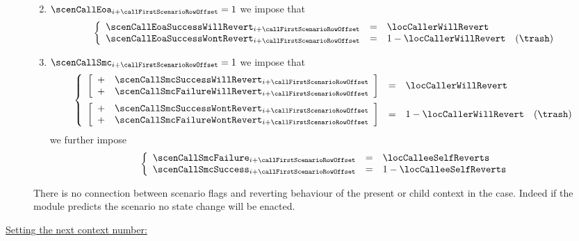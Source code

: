 \begin{description}
\begin{enumerate}
\[				\]
			\item \If $\scenCallEoa  _{i + \callFirstScenarioRowOffset} = 1$ \Then we impose that
				\[
					\left\{ \begin{array}{lclr}
						\scenCallEoaSuccessWillRevert _{i + \callFirstScenarioRowOffset} & = & \locCallerWillRevert     \\
						\scenCallEoaSuccessWontRevert _{i + \callFirstScenarioRowOffset} & = & 1 - \locCallerWillRevert  & (\trash) \\
					\end{array} \right.
				\]
			\item \If $\scenCallSmc  _{i + \callFirstScenarioRowOffset} = 1$ \Then we impose that
				\[
					\left\{ \begin{array}{lclr}
						\left[ \begin{array}{ll}
							+ & \scenCallSmcSuccessWillRevert _{i + \callFirstScenarioRowOffset} \\
							+ & \scenCallSmcFailureWillRevert _{i + \callFirstScenarioRowOffset} \\
						\end{array} \right] & = & \locCallerWillRevert \vspace{2mm} \\
						\left[ \begin{array}{ll}
							+ & \scenCallSmcSuccessWontRevert _{i + \callFirstScenarioRowOffset} \\
							+ & \scenCallSmcFailureWontRevert _{i + \callFirstScenarioRowOffset} \\
						\end{array} \right] & = & 1 - \locCallerWillRevert & (\trash) \\
					\end{array} \right.
				\]
				we further impose
				\[
					\left\{ \begin{array}{lclr}
						\scenCallSmcFailure _{i + \callFirstScenarioRowOffset} & = & \locCalleeSelfReverts     \\
						\scenCallSmcSuccess _{i + \callFirstScenarioRowOffset} & = & 1 - \locCalleeSelfReverts \\
					\end{array} \right.
				\]
		\end{enumerate}
		\saNote{}
		There is no connection between scenario flags and reverting behaviour of the present or child context in the \scenCallPrcFailure{} case.
		Indeed if the \hubMod{} module predicts the \scenCallPrcFailure{} scenario no state change will be enacted.
	\item[\underline{Setting the next context number:}]

\end{description}
